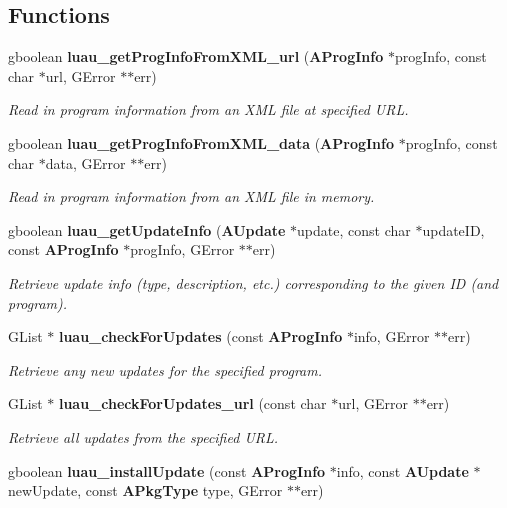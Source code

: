 \subsection*{Functions}
\begin{CompactItemize}
\item 
gboolean {\bf luau\_\-get\-Prog\-Info\-From\-XML\_\-url} ({\bf AProg\-Info} $\ast$prog\-Info, const char $\ast$url, GError $\ast$$\ast$err)
\begin{CompactList}\small\item\em Read in program information from an XML file at specified URL. \item\end{CompactList}\item 
gboolean {\bf luau\_\-get\-Prog\-Info\-From\-XML\_\-data} ({\bf AProg\-Info} $\ast$prog\-Info, const char $\ast$data, GError $\ast$$\ast$err)
\begin{CompactList}\small\item\em Read in program information from an XML file in memory. \item\end{CompactList}\item 
gboolean {\bf luau\_\-get\-Update\-Info} ({\bf AUpdate} $\ast$update, const char $\ast$update\-ID, const {\bf AProg\-Info} $\ast$prog\-Info, GError $\ast$$\ast$err)
\begin{CompactList}\small\item\em Retrieve update info (type, description, etc.) corresponding to the given ID (and program). \item\end{CompactList}\item 
GList $\ast$ {\bf luau\_\-check\-For\-Updates} (const {\bf AProg\-Info} $\ast$info, GError $\ast$$\ast$err)
\begin{CompactList}\small\item\em Retrieve any new updates for the specified program. \item\end{CompactList}\item 
GList $\ast$ {\bf luau\_\-check\-For\-Updates\_\-url} (const char $\ast$url, GError $\ast$$\ast$err)
\begin{CompactList}\small\item\em Retrieve all updates from the specified URL. \item\end{CompactList}\item 
gboolean {\bf luau\_\-install\-Update} (const {\bf AProg\-Info} $\ast$info, const {\bf AUpdate} $\ast$new\-Update, const {\bf APkg\-Type} type, GError $\ast$$\ast$err)

\end{CompactItemize}
